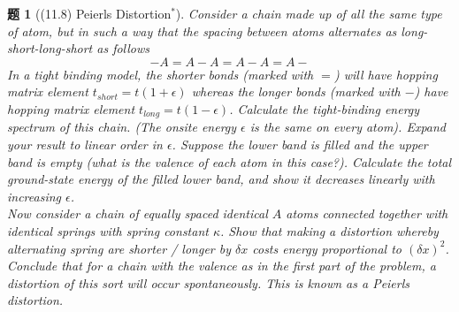 \documentclass[UTF8,10pt,a4paper]{article}
\theoremstyle{Problem}
\newtheorem{prob}{题}
\theoremstyle{Solution}
\begin{document}
\begin{prob}[(11.8) Peierls Distortion$^*$]
    Consider a chain made up of all the same type of atom, but in such a way that the spacing between atoms alternates as long-short-long-short as follows
    \[
        -A=A-A=A-A=A-
    \]
    In a tight binding model, the shorter bonds (marked with $=$) will have hopping matrix element $t_{short}=t(1+\epsilon)$ whereas the longer bonds (marked with $-$) have hopping matrix element $t_{long}=t(1-\epsilon)$. Calculate the tight-binding energy spectrum of this chain. (The onsite energy $\epsilon$ is the same on every atom). Expand your result to linear order in $\epsilon$. Suppose the lower band is filled and the upper band is empty (what is the valence of each atom in this case?). Calculate the total ground-state energy of the filled lower band, and show it decreases linearly with increasing $\epsilon$.\\
    Now consider a chain of equally spaced identical $A$ atoms connected together with identical springs with spring constant $\kappa$. Show that making a distortion whereby alternating spring are shorter / longer by $\delta x$ costs energy proportional to $(\delta x)^2$. Conclude that for a chain with the valence as in the first part of the problem, a distortion of this sort will occur spontaneously. This is known as a Peierls distortion.
\end{prob}
\end{document}
